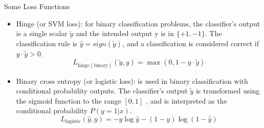 \documentclass[handout]{beamer}
\begin{document}
\begin{frame}{Some Loss Functions}
\begin{scriptsize}
\begin{itemize}
 \item Hinge (or SVM loss):  for binary classification problems, the classifier's output is a single scalar $\tilde{y}$ and the intended output y is in $\{+1,-1\}$.  The classification rule is $\hat{y} = sign(\tilde{y})$, and a classification is considered correct if $y \cdot \tilde{y} > 0$.  
 \begin{displaymath}
  L_{\text{hinge}(\text{binary})}(\tilde{y},y) = \max(0,1-y \cdot \tilde{y})  
 \end{displaymath}

 \item Binary cross entropy (or logistic loss): is used in binary classification with conditional probability outputs. The classifier's output $\tilde{y}$ is transformed using the sigmoid function to the range $[0,1]$ , and is interpreted as the conditional probability $P(y=1|x)$.
  \begin{displaymath}
  L_{\text{logistic}}(\hat{y},y) = -y \log \hat{y} - (1-y) \log(1-\hat{y})  
 \end{displaymath}
 
\end{itemize}
\end{scriptsize}

\end{frame}
\end{document}
